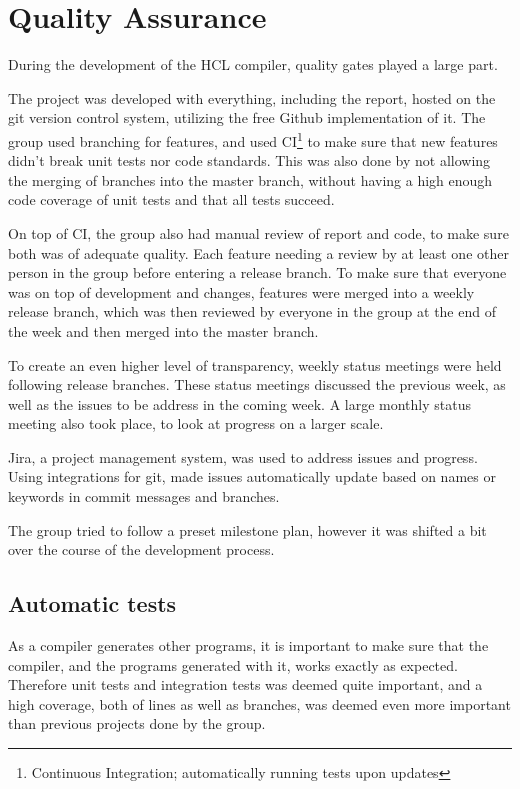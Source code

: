\section{Quality Assurance}
During the development of the HCL compiler, quality gates played a large part.

The project was developed with everything, including the report, hosted on the git\cite{GitProtocol} version control system, utilizing the free Github implementation of it.
The group used branching for features, and used CI\footnote{Continuous Integration; automatically running tests upon updates} to make sure that new features didn't break unit tests nor code standards.
This was also done by not allowing the merging of branches into the master branch, without having a high enough code coverage of unit tests and that all tests succeed.

On top of CI, the group also had manual review of report and code, to make sure both was of adequate quality. 
Each feature needing a review by at least one other person in the group before entering a release branch.
To make sure that everyone was on top of development and changes, features were merged into a weekly release branch, which was then reviewed by everyone in the group at the end of the week and then merged into the master branch.

To create an even higher level of transparency, weekly status meetings were held following release branches.
These status meetings discussed the previous week, as well as the issues to be address in the coming week. 
A large monthly status meeting also took place, to look at progress on a larger scale. 

Jira\cite{Jira}, a project management system, was used to address issues and progress.
Using integrations for git, made issues automatically update based on names or keywords in commit messages and branches.

The group tried to follow a preset milestone plan, however it was shifted a bit over the course of the development process.

\subsection{Automatic tests}

As a compiler generates other programs, it is important to make sure that the compiler, and the programs generated with it, works exactly as expected.
Therefore unit tests and integration tests was deemed quite important, and a high coverage, both of lines as well as branches, was deemed even more important than previous projects done by the group. 

